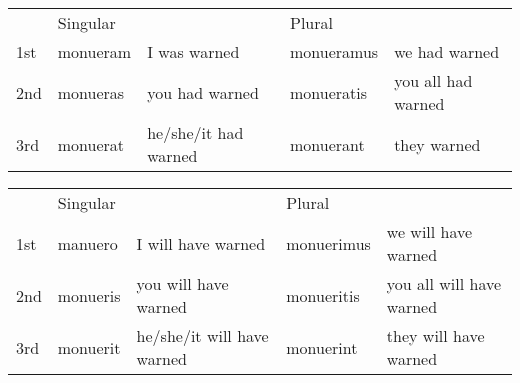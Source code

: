 \begin{center}  
  \begin{tabular}{lllll}
    \centering
    & Singular & & Plural &  \\
    1st & monueram & I was warned& monueramus & we had warned\\
    2nd & monueras & you had warned& monueratis & you all had warned\\ 
    3rd & monuerat & he/she/it had warned& monuerant & they warned\\
  \end{tabular}
\end{center}


\begin{center}  
  \begin{tabular}{lllll}
    \centering
    & Singular & & Plural &  \\
    1st & manuero & I will have warned& monuerimus & we will have warned\\
    2nd & monueris & you will have warned& monueritis & you all will have warned\\ 
    3rd & monuerit & he/she/it will have warned& monuerint & they will have warned\\
  \end{tabular}
\end{center}    
